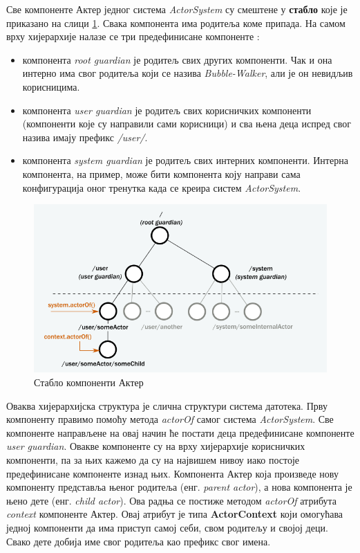 \documentclass[12pt,oneside]{memoir}
\begin{document}
Све компоненте Актер једног система \textit{ActorSystem} су смештене у \textbf{стабло} које је приказано на слици \ref{fig:stablo}. Свака компонента има родитеља коме припада. На самом врху хијерархије налазе се три предефинисане компоненте \cite{akkaDoc}:
\begin{itemize}
\item компонента \textit{root guardian} је родитељ свих других компоненти. Чак и она интерно има свог родитеља који се назива \textit{Bubble-Walker}, али је он невидљив корисницима.
\item компонента \textit{user guardian} је родитељ свих корисничких компоненти (компоненти које су направили сами корисници) и сва њена деца испред свог назива имају префикс \textit{/user/}.
\item компонента \textit{system guardian} је родитељ свих интерних компоненти. Интерна компонента, на пример, може бити компонента коју направи сама конфигурација оног тренутка када се креира систем \textit{ActorSystem}. 
\end{itemize}

\begin{figure}[!ht]
  \centering
  \includegraphics[width=1\textwidth]{akkaTree.png}
  \caption{Стабло компоненти Актер}
  \label{fig:stablo}
\end{figure}

Оваква хијерархијска структура је слична структури система датотека. Прву компоненту правимо помоћу метода \textit{actorOf} самог система \textit{ActorSystem}. Све компоненте направљене на овај начин ће постати деца предефинисане компоненте \textit{user guardian}. Овакве компоненте су на врху хијерархије корисничких компоненти, па за њих кажемо да су на највишем нивоу иако постоје предефинисане компоненте изнад њих. Компонента Актер која произведе нову компоненту представља њеног родитеља (енг. \textit{parent actor}), а нова компонента је њено дете (енг. \textit{child actor}). Ова радња се постиже методом \textit{actorOf} атрибута \textit{context} компоненте Актер. Овај атрибут је типа \textbf{ActorContext} који омогућава једној компоненти да има приступ самој себи, свом родитељу и својој деци. Свако дете добија име свог родитеља као префикс свог имена.
\end{document}
